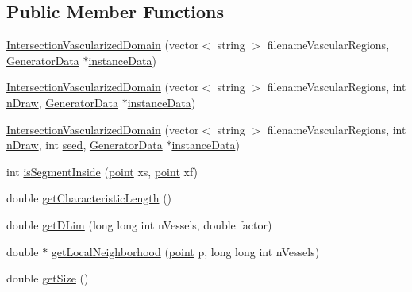 \subsection*{Public Member Functions}
\begin{DoxyCompactItemize}
\item 
\hyperlink{class_intersection_vascularized_domain_ad5eb56a0c6f7197af3d1263f7625bbc5}{Intersection\+Vascularized\+Domain} (vector$<$ string $>$ filename\+Vascular\+Regions, \hyperlink{class_generator_data}{Generator\+Data} $\ast$\hyperlink{class_abstract_domain_aa37fbabc2bfa92c574f7db7544016b53}{instance\+Data})
\item 
\hyperlink{class_intersection_vascularized_domain_a5bd62b749b6f25562b7170e3bfb8f6d7}{Intersection\+Vascularized\+Domain} (vector$<$ string $>$ filename\+Vascular\+Regions, int \hyperlink{class_intersection_vascularized_domain_a98a16d98d16b37b13593d7a2aee872f3}{n\+Draw}, \hyperlink{class_generator_data}{Generator\+Data} $\ast$\hyperlink{class_abstract_domain_aa37fbabc2bfa92c574f7db7544016b53}{instance\+Data})
\item 
\hyperlink{class_intersection_vascularized_domain_a5b6f8a4f0c2a4eac2ba76dc3345a0994}{Intersection\+Vascularized\+Domain} (vector$<$ string $>$ filename\+Vascular\+Regions, int \hyperlink{class_intersection_vascularized_domain_a98a16d98d16b37b13593d7a2aee872f3}{n\+Draw}, int \hyperlink{class_intersection_vascularized_domain_abe078f4d223d21554d6f6709d5db47b0}{seed}, \hyperlink{class_generator_data}{Generator\+Data} $\ast$\hyperlink{class_abstract_domain_aa37fbabc2bfa92c574f7db7544016b53}{instance\+Data})
\item 
int \hyperlink{class_intersection_vascularized_domain_accd160eb77fede65322d67293177e54f}{is\+Segment\+Inside} (\hyperlink{structpoint}{point} xs, \hyperlink{structpoint}{point} xf)
\item 
double \hyperlink{class_intersection_vascularized_domain_a6ded581a637a098d2ddfec6ae6801132}{get\+Characteristic\+Length} ()
\item 
double \hyperlink{class_intersection_vascularized_domain_a24e31c45b099a27ea3d13b1923ea5340}{get\+D\+Lim} (long long int n\+Vessels, double factor)
\item 
double $\ast$ \hyperlink{class_intersection_vascularized_domain_a4b35793edb3ec9847e8be75d81dfbd9d}{get\+Local\+Neighborhood} (\hyperlink{structpoint}{point} p, long long int n\+Vessels)
\item 
double \hyperlink{class_intersection_vascularized_domain_a4c4dc6ce4711752e7d082346499d70b5}{get\+Size} ()

\end{DoxyCompactItemize}
